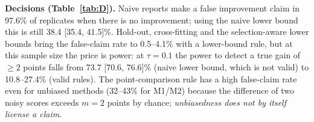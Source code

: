 \textbf{Decisions (Table~\ref{tab:D}).} Naive reports make a false improvement claim in 97.6\% of replicates when there is no improvement; using the naive lower bound this is still 38.4 [35.4, 41.5]\%. Hold-out, cross-fitting and the selection-aware lower bounds bring the false-claim rate to 0.5--4.1\% with a lower-bound rule, but at this sample size the price is power: at $\tau=0.1$ the power to detect a true gain of $\geq 2$ points falls from 73.7 [70.6, 76.6]\% (naive lower bound, which is not valid) to 10.8--27.4\% (valid rules). The point-comparison rule has a high false-claim rate even for unbiased methods (32--43\% for M1/M2) because the difference of two noisy scores exceeds $m=2$ points by chance; \emph{unbiasedness does not by itself license a claim}.

